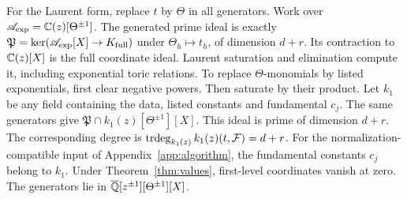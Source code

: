 For the Laurent form, replace $t$ by $\Theta$ in all generators.
Work over $\mathscr A_{\exp}=\mathbb{C}(z)[\Theta^{\pm1}]$.
The generated prime ideal is exactly
$\mathfrak P=\ker(\mathscr A_{\exp}[X]\to K_{\rm full})$ under $\Theta_h\mapsto t_h$,
of dimension $d+r$. \mbox{Its} contraction to $\mathbb{C}(z)[X]$ is the full coordinate ideal.
Laurent saturation and elimination compute it, including exponential toric relations.
To replace $\Theta$-monomials by listed exponentials, first clear negative powers.
Then saturate by their product. Let $k_1$ be any field containing
the data, listed constants and fundamental $c_j$.
The same generators give $\mathfrak P\cap k_1(z)[\Theta^{\pm1}][X]$.
This ideal is prime of dimension $d+r$.
The corresponding degree is $\operatorname{trdeg}_{k_1(z)}k_1(z)(t,\mathcal F)=d+r$.
For the normalization-compatible input of Appendix~\ref{app:algorithm},
the fundamental constants $c_j$ belong to $k_1$.
Under Theorem~\ref{thm:values}, first-level coordinates vanish at zero.
The generators lie in
${\overline{\mathbb{Q}}}[z^{\pm1}][\Theta^{\pm1}][X]$.

